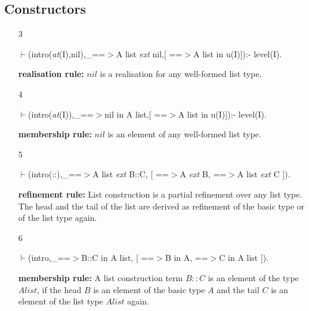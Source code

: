\documentclass[11pt]{report}
\begin{document}
 \subsection{Constructors}
 \begin{enumerate}
 \item[3]
\begin{sf}\begin{tabbing}
$\vdash$(intro(\mbox{\it at}(I),nil),\_\hspace{0.1em}==$>$A list \mbox{\it ext} nil,[ ==$>$A list in u(I)]):- level(I).
\end{tabbing}\end{sf}

 {\bf realisation rule:}
 $nil$ is a realisation for any well-formed list type.
  
 \item[4]
\begin{sf}\begin{tabbing}
$\vdash$(intro(\mbox{\it at}(I)),\_\hspace{0.1em}==$>$nil in A list,[ ==$>$A list in u(I)]):- level(I).
\end{tabbing}\end{sf}

 {\bf membership rule:}
 $nil$ is an element of any well-formed list type.
  
 \item[5]
\begin{sf}\begin{tabbing}
$\vdash$(intro(::),\_\hspace{0.1em}==$>$A list \mbox{\it ext} B::C, [ ==$>$A \mbox{\it ext} B, ==$>$A list \mbox{\it ext} C ]).
\end{tabbing}\end{sf}

 {\bf refinement rule:} 
 List construction is a partial refinement over any list type.
 The head and the tail of the list are derived as refinement of
 the basic type or of the list type again.
  
 \item[6]
\begin{sf}\begin{tabbing}
$\vdash$(intro,\_\hspace{0.1em}==$>$B::C in A list, [ ==$>$B in A, ==$>$C in A list ]).
\end{tabbing}\end{sf}

 {\bf membership rule:} 
 A list construction term $B::C$ is an element of the type $A list$,
 if the head $B$ is an element of the basic type $A$ and the
 tail $C$ is an element of the list type $A list$ again.
  

\end{enumerate}
\end{document}
